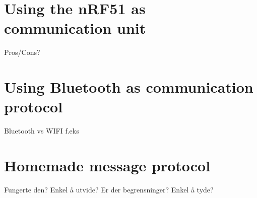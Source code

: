 \section{Using the nRF51 as communication unit}
Pros/Cons?

\section{Using Bluetooth as communication protocol}
Bluetooth vs WIFI f.eks

\section{Homemade message protocol}
Fungerte den? Enkel å utvide? Er der begrensninger? Enkel å tyde?